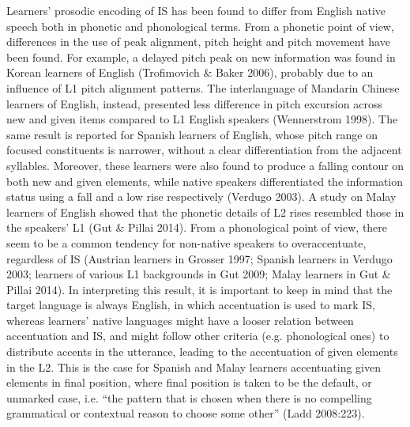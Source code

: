 \begin{styleStandard}
Learners’ prosodic encoding of IS has been found to differ from English native speech both in phonetic and phonological terms. From a phonetic point of view, differences in the use of peak alignment, pitch height and pitch movement have been found. For example, a delayed pitch peak on new information was found in Korean learners of English (Trofimovich \& Baker 2006), probably due to an influence of L1 pitch alignment patterns. The interlanguage of Mandarin Chinese learners of English, instead, presented less difference in pitch excursion across new and given items compared to L1 English speakers (Wennerstrom 1998). The same result is reported for Spanish learners of English, whose pitch range on focused constituents is narrower, without a clear differentiation from the adjacent syllables. Moreover, these learners were also found to produce a falling contour on both new and given elements, while native speakers differentiated the information status using a fall and a low rise respectively (Verdugo 2003). A study on Malay learners of English showed that the phonetic details of L2 rises resembled those in the speakers’ L1 (Gut \& Pillai 2014). From a phonological point of view, there seem to be a common tendency for non-native speakers to overaccentuate, regardless of IS (Austrian learners in Grosser 1997; Spanish learners in Verdugo 2003; learners of various L1 backgrounds in Gut 2009; Malay learners in Gut \& Pillai 2014). In interpreting this result, it is important to keep in mind that the target language is always English, in which accentuation is used to mark IS, whereas learners’ native languages might have a looser relation between accentuation and IS, and might follow other criteria (e.g. phonological ones) to distribute accents in the utterance, leading to the accentuation of given elements in the L2. This is the case for Spanish and Malay learners accentuating given elements in final position, where final position is taken to be the default, or unmarked case, i.e. “the pattern that is chosen when there is no compelling grammatical or contextual reason to choose some other” (Ladd 2008:223).
\end{styleStandard}

